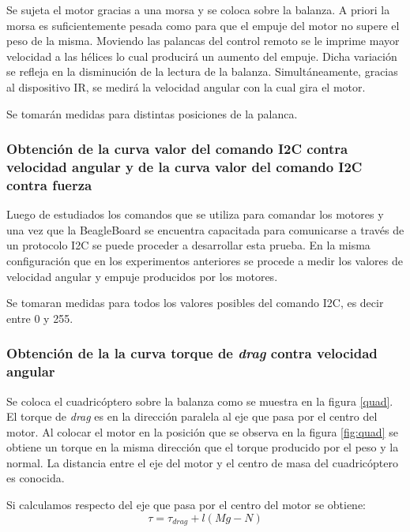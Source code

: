 \documentclass[spanish,12pt,a4paper,titlepage]{report}
\begin{document}
Se sujeta el motor gracias a una morsa y se coloca sobre la balanza. A priori la morsa es suficientemente pesada como para que el empuje del motor no supere el peso de la misma. Moviendo las palancas del control remoto se le imprime mayor velocidad a las hélices lo cual producirá un aumento del empuje. Dicha variación se refleja en la disminución de la lectura de la balanza. 
Simultáneamente, gracias al dispositivo IR, se medirá la velocidad angular con la cual gira el motor. 

Se tomarán medidas para distintas posiciones de la palanca.

\subsubsection*{Obtención de la curva valor del comando I2C contra velocidad angular y de la curva valor del comando I2C contra fuerza}

Luego de estudiados los comandos que se utiliza para comandar los motores y una vez que la BeagleBoard se encuentra capacitada para comunicarse a través de un protocolo I2C se puede proceder a desarrollar esta prueba. En la misma configuración que en los experimentos anteriores se procede a medir los valores de velocidad angular y empuje producidos por los motores. 

Se tomaran medidas para todos los valores posibles del comando I2C, es decir entre 0 y 255.

\subsubsection*{Obtención de la la curva torque de \emph{drag} contra velocidad angular}
\label{dragt}
Se coloca el cuadricóptero sobre la balanza como se muestra en la figura \ref{quad}. El torque de \emph{drag} es en la dirección paralela al eje que pasa por el centro del motor. Al colocar el motor en la posición que se observa en la figura \ref{fig:quad} se obtiene un torque en la misma dirección que el torque producido por el peso y la normal. La distancia entre el eje del motor y el centro de masa del cuadricóptero es conocida.

Si calculamos respecto del eje que pasa por el centro del motor se obtiene:
\begin{equation}
\tau =  \tau_{drag}+l(Mg-N)
\end{equation}
\end{document}
